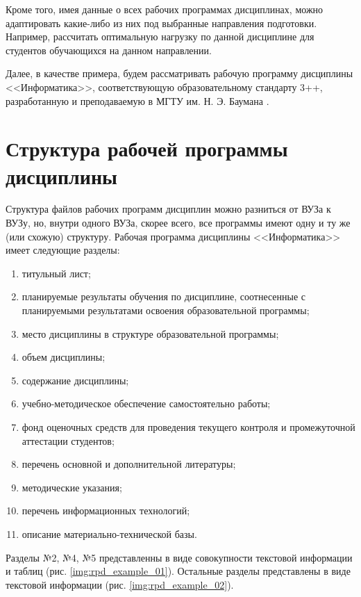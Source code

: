 Кроме того, имея данные о всех рабочих программах дисциплинах, можно адаптировать какие-либо из них под выбранные направления подготовки. Например, рассчитать оптимальную нагрузку по данной дисциплине для студентов обучающихся на данном направлении.

Далее, в качестве примера, будем рассматривать рабочую программу дисциплины <<Информатика>>, соответствующую образовательному стандарту 3++, разработанную и преподаваемую в МГТУ им. Н. Э. Баумана \cite{bmstu}.

\section{Структура рабочей программы дисциплины}

Структура файлов рабочих программ дисциплин можно разниться от ВУЗа к ВУЗу, но, внутри одного ВУЗа, скорее всего, все программы имеют одну и ту же (или схожую) структуру. Рабочая программа дисциплины <<Информатика>> имеет следующие разделы:

\begin{enumerate}
	\item титульный лист;
	\item планируемые результаты обучения по дисциплине, соотнесенные с планируемыми результатами освоения образовательной программы;
	\item место дисциплины в структуре образовательной программы;
	\item объем дисциплины;
	\item содержание дисциплины;
	\item учебно-методическое обеспечение самостоятельно работы;
	\item фонд оценочных средств для проведения текущего контроля и промежуточной аттестации студентов;
	\item перечень основной и дополнительной литературы;
	\item методические указания;
	\item перечень информационных технологий;
	\item описание материально-технической базы.
\end{enumerate}

Разделы №2, №4, №5 представленны в виде совокупности текстовой информации и таблиц (рис. \ref{img:rpd_example_01}). Остальные разделы представлены в виде текстовой информации (рис. \ref{img:rpd_example_02}).

